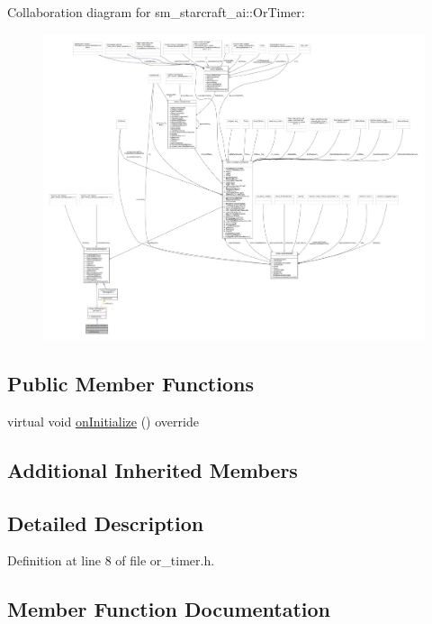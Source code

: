 Collaboration diagram for sm\+\_\+starcraft\+\_\+ai\+:\+:Or\+Timer\+:
\nopagebreak
\begin{figure}[H]
\begin{center}
\leavevmode
\includegraphics[width=350pt]{classsm__starcraft__ai_1_1OrTimer__coll__graph}
\end{center}
\end{figure}
\subsection*{Public Member Functions}
\begin{DoxyCompactItemize}
\item 
virtual void \hyperlink{classsm__starcraft__ai_1_1OrTimer_ab78cf9b6e7ba9a53f5454ffb007da71b}{on\+Initialize} () override
\end{DoxyCompactItemize}
\subsection*{Additional Inherited Members}


\subsection{Detailed Description}


Definition at line 8 of file or\+\_\+timer.\+h.



\subsection{Member Function Documentation}
\mbox{\label{classsm__starcraft__ai_1_1OrTimer_ab78cf9b6e7ba9a53f5454ffb007da71b}} 
